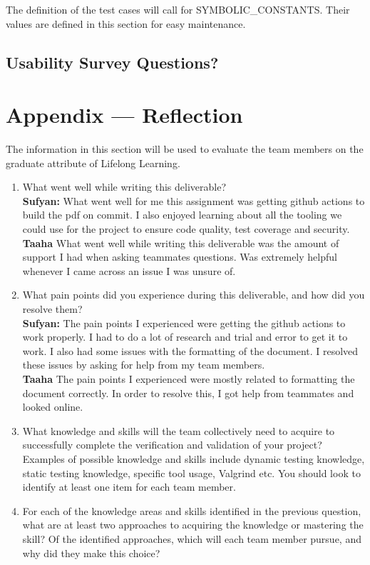 \documentclass[12pt, titlepage]{article}
\begin{document}
The definition of the test cases will call for SYMBOLIC\_CONSTANTS.
Their values are defined in this section for easy maintenance.

\subsection{Usability Survey Questions?}


\newpage{}
\section*{Appendix --- Reflection}


The information in this section will be used to evaluate the team members on the
graduate attribute of Lifelong Learning.



\begin{enumerate}
  \item What went well while writing this deliverable? \\
  \textbf{Sufyan:} What went well for me this assignment was getting github actions to build the pdf on commit. I also enjoyed learning about all the tooling we could use for the project to ensure code quality, test coverage and security. \\
  \textbf{Taaha} What went well while writing this deliverable was the amount of support I had when asking teammates questions. Was extremely helpful whenever I came across an issue I was unsure of.
  \item What pain points did you experience during this deliverable, and how
    did you resolve them? \\
  \textbf{Sufyan:} The pain points I experienced were getting the github actions to work properly. I had to do a lot of research and trial and error to get it to work. I also had some issues with the formatting of the document. I resolved these issues by asking for help from my team members. \\
  \textbf{Taaha} The pain points I experienced were mostly related to formatting the document correctly. In order to resolve this, I got help from teammates and looked online.
  \item What knowledge and skills will the team collectively need to acquire to
  successfully complete the verification and validation of your project?
  Examples of possible knowledge and skills include dynamic testing knowledge,
  static testing knowledge, specific tool usage, Valgrind etc.  You should look to
  identify at least one item for each team member.
  \item For each of the knowledge areas and skills identified in the previous
  question, what are at least two approaches to acquiring the knowledge or
  mastering the skill?  Of the identified approaches, which will each team
  member pursue, and why did they make this choice?
\end{enumerate}
\end{document}
